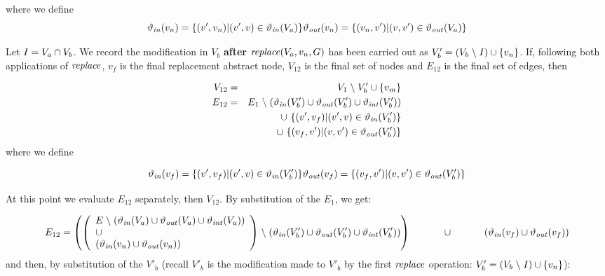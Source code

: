 where we define
\[
\mathit{\vartheta_{in}}(v_n) = \{(v',v_n)|(v',v) \in \mathit{\vartheta_{in}}(V_a) \}\\
\mathit{\vartheta_{out}}(v_n) = \{(v_n,v')|(v,v') \in \mathit{\vartheta_{out}}(V_a) \}
\]

\noindent  
Let $I = V_a \cap V_b$.  We record the modification in $V_b$ \textbf{after} $\mathit{replace}(V_a,v_n,G)$ has been carried out as $V'_b = (V_b\mathrel{\backslash} I)\cup\{v_{n}\}$.
If, following both applications of $\mathit{replace}$,  $v_f$ is the final replacement abstract node, $V_{12}$ is the final set of nodes and $E_{12}$ is the final set of edges, then

\begin{eqnarray*}
  V_{12} & = & V_1 \mathrel{\backslash} V'_b \cup \{v_m\} \\
  E_{12} &  = & E_1\mathrel{\backslash} ( \mathit{\vartheta_{in}}(V'_b) \cup \mathit{\vartheta_{out}}(V'_b) \cup \mathit{\vartheta_{int}}(V'_b) )\\
  && \cup\ \{(v',v_{f})|(v',v) \in \mathit{\vartheta_{in}}(V'_b) \}\\
  && \cup\ \{(v_{f},v')|(v,v') \in \mathit{\vartheta_{out}}(V'_b) \}
\end{eqnarray*}
\noindent
where we define 

\[
 \mathit{\vartheta_{in}}(v_f) = \{(v',v_f)|(v',v) \in \mathit{\vartheta_{in}}(V'_b) \}\\
 \mathit{\vartheta_{out}}(v_f) = \{(v_f,v')|(v,v') \in \mathit{\vartheta_{out}}(V'_b) \}
 \]

  

 \noindent
 At this point we evaluate $E_{12}$ separately, then $V_{12}$.  By substitution of the $E_1$, we get: 

\[
E_{12}  =  \left( \left(
\begin{array}{l}  E\hide(\INN(V_a) \union \OUT(V_a) \union \INT(V_a)) \\  \union \\ (\INN(v_n) \union \OUT(v_n) ) \\
\end{array} \right)
   \hide ( \INN(V'_b) \union \OUT(V'_b) \union \INT(V'_b) ) \right) \\
\hphantom{E_{12}  = \;\; }   \union\ \\
\hphantom{E_{12}  = \;\;}   (\INN(v_f) \union \OUT(v_f))
\]
\noindent
and then, by substitution of the $V'_b$ (recall $V'_b$ is the modification made to $V'_b$ by the first $\mathit{replace}$ operation: $V'_b = (V_b\mathrel{\backslash} I)\cup\{v_{n}\}$):

